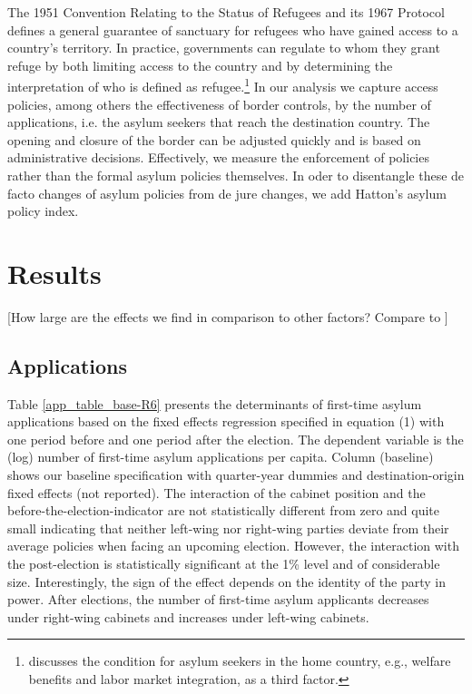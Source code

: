 \documentclass[a4paper,12pt]{article}
\begin{document}
The 1951 Convention Relating to the Status of Refugees and its 1967 Protocol defines a general guarantee of sanctuary for refugees who have gained access to a country's territory. In practice, governments can regulate to whom they grant refuge by both limiting access to the country and by determining the interpretation of who is defined as refugee.\footnote{\citet{hatton2009} discusses the condition for asylum seekers in the home country, e.g., welfare benefits and labor market integration, as a third factor.} In our analysis we capture access policies, among others the effectiveness of border controls, by the number of applications, i.e. the asylum seekers that reach the destination country. The opening and closure of the border can be adjusted quickly and is based on administrative decisions. Effectively, we measure the enforcement of policies rather than the formal asylum policies themselves. In oder to disentangle these de facto changes of asylum policies from de jure changes, we add Hatton's asylum policy index.

\section{Results} \label{sec:results}

[How large are the effects we find in comparison to other factors? Compare to \citet{thielemann2006}]

\subsection{Applications}

Table \ref{app_table_base-R6} presents the determinants of first-time asylum applications based on the fixed effects regression specified in equation (1) with one period before and one period after the election.
 The dependent variable is the (log) number of first-time asylum applications per capita. 
 Column (baseline) shows our baseline specification with quarter-year dummies and destination-origin fixed effects (not reported). 
  The interaction of the cabinet position and the before-the-election-indicator are not statistically different from zero and quite small indicating that neither left-wing nor right-wing parties deviate from their average policies when facing an upcoming election. However, the interaction with the post-election is statistically significant at the 1\% level and of considerable size. Interestingly, the sign of the effect depends on the identity of the party in power. After elections, the number of first-time asylum applicants decreases under right-wing cabinets and increases under left-wing cabinets. 
\end{document}
